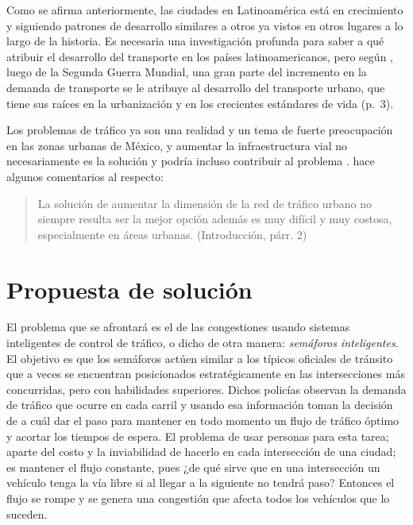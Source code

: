 Como se afirma anteriormente, las ciudades en Latinoamérica está en
crecimiento y siguiendo patrones de desarrollo similares a otros ya
vistos en otros lugares a lo largo de la historia. Es necesaria una
investigación profunda para saber a qué atribuir el desarrollo del
transporte en los países latinoamericanos, pero según
\textcite{Patriksson2012}, luego de la Segunda Guerra Mundial, una gran
parte del incremento en la demanda de transporte se le atribuye al
desarrollo del transporte urbano, que tiene sus raíces en la
urbanización y en los crecientes estándares de vida (p.~3).

Los problemas de tráfico ya son una realidad y un tema de fuerte
preocupación en las zonas urbanas de México, y aumentar la
infraestructura vial no necesariamente es la solución y podría incluso
contribuir al problema \parencite[124-126]{Galindo2006}.
\textcite{JoelTrejo2006} hace algunos comentarios al respecto:

\begin{quote}
La solución de aumentar la dimensión de la red de tráfico urbano no
siempre resulta ser la mejor opción además es muy difícil y muy costosa,
especialmente en áreas urbanas. (Introducción, párr. 2)
\end{quote}

\hypertarget{propuesta-de-soluciuxf3n}{%
\section{Propuesta de solución}\label{propuesta-de-soluciuxf3n}}

El problema que se afrontará es el de las congestiones usando sistemas
inteligentes de control de tráfico, o dicho de otra manera:
\emph{semáforos inteligentes}. El objetivo es que los semáforos actúen
similar a los típicos oficiales de tránsito que a veces se encuentran
posicionados estratégicamente en las intersecciones más concurridas,
pero con habilidades superiores. Dichos policías observan la demanda de
tráfico que ocurre en cada carril y usando esa información toman la
decisión de a cuál dar el paso para mantener en todo momento un flujo de
tráfico óptimo y acortar los tiempos de espera. El problema de usar
personas para esta tarea; aparte del costo y la inviabilidad de hacerlo
en cada intersección de una ciudad; es mantener el flujo constante, pues
¿de qué sirve que en una intersección un vehículo tenga la vía libre si
al llegar a la siguiente no tendrá paso? Entonces el flujo se rompe y se
genera una congestión que afecta todos los vehículos que lo suceden.

